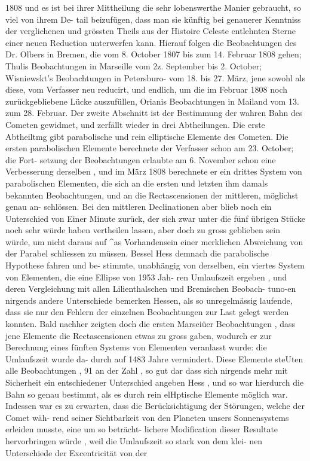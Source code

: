 \documentclass[12pt,a4paper]{article}
\begin{document}
1808  und  es  ist  bei  ihrer  Mittheilung  die  sehr  lobenswerthe  Manier  gebraucht,  so  viel  von  ihrem  De- tail beizufügen,  dass  man  sie  künftig  bei  genauerer  Kenntniss  der  verglichenen  und  grössten  Theils  aus der  Histoire  Celeste  entlehnten  Sterne  einer  neuen  Reduction  unterwerfen  kann.  Hierauf  folgen  die Beobachtungen  des  Dr.  Olbers  in  Bremen,  die  vom  8.  October  1807  bis  zum  14.  Februar  1808  gehen; Thulis  Beobachtungen  in  Marseille  vom  2z.  September  bis  2.  October;  Wisniewskt's  Beobachtungen  in Petersburo-  vom  18.  bis  27.  März,  jene  sowohl  als  diese,  vom  Verfasser  neu  reducirt,  und  endlich,  um die  im  Februar  1808  noch  zurückgebliebene  Lücke  auszufüllen,  Orianis  Beobachtungen  in  Mailand  vom 13.  zum  28.  Februar. Der  zweite  Abschnitt  ist  der  Bestimmung  der  wahren  Bahn  des  Cometen  gewidmet,  und  zerfällt wieder  in  drei  Abtheilungen.  Die  erste  Abtheiltmg  gibt  parabolische  und  rein  elliptische  Elemente  des Cometen.  Die  ersten  parabolischen  Elemente  berechnete  der  Verfasser  schon  am  23.  October;  die  Fort- setzung der  Beobachtungen  erlaubte  am  6.  November  schon  eine  Verbesserung  derselben ,  und  im  März 1808  berechnete  er  ein  drittes  System  von  parabolischen  Elementen,  die  sich  an  die  ersten  und  letzten ihm  damals  bekannten  Beobachtungen,  und  an  die  Rectascensionen  der  mittleren,  möglichst  genau  an- schlössen. Bei  den  mittleren  Declinationen  aber  blieb  noch  ein  Unterschied  von  Einer  Minute  zurück, der  sich  zwar  unter  die  fünf  übrigen  Stücke  noch  sehr  würde  haben  vertheilen  lassen,  aber  doch  zu gross  geblieben  sein  würde,  um  nicht  daraus  auf  \textasciicircum{}as  Vorhandensein  einer  merklichen  Abweichung  von der  Parabel  schliessen  zu  müssen.  Bessel  Hess  demnach  die  parabolische  Hypothese  fahren  und  be- stimmte, unabhängig  von  derselben,  ein  viertes  System  von  Elementen,  die  eine  Ellipse  von  1953  Jah- ren Umlaufszeit  ergeben  ,  und  deren  Vergleichung  mit  allen  Lilienthalschen  und  Bremischen  Beobach- tuno-en  nirgends  andere  Unterschiede  bemerken  Hessen,  als  so  unregelmässig  laufende,  dass  sie  nur  den Fehlern  der  einzelnen  Beobachtungen  zur  Last  gelegt  werden  konnten.  Bald  nachher  zeigten  doch  die ersten  Marseiüer  Beobachtungen ,  dass  jene  Elemente  die  Rectascensionen  etwas  zu  gross  gaben,  wodurch er  zur  Berechnung  eines  fünften  Systems  von  Elementen  veranlasst  wurde:  die  Umlaufszeit  wurde  da- durch auf  1483  Jahre  vermindert.  Diese  Elemente  steUten  alle  Beobachtungen ,  91  an  der  Zahl ,  so  gut dar  dass  sich  nirgends  mehr  mit  Sicherheit  ein  entschiedener  Unterschied  angeben  Hess ,  und  so  war hierdurch  die  Bahn  so  genau  bestimmt,  als  es  durch  rein  elHptische  Elemente  möglich  war. Indessen  war  es  zu  erwarten,  dass  die  Berücksichtigung  der  Störungen,  welche  der  Comet  wäh- rend seiner  Sichtbarkeit  von  den  Planeten  unsers  Sonnensystems  erleiden  musste,  eine  um  so  beträcht- lichere Modification  dieser  Resultate  hervorbringen  würde ,  weil  die  Umlaufszeit  so  stark  von  dem  klei- nen Unterschiede  der  Excentricität  von  der  
\end{document}
